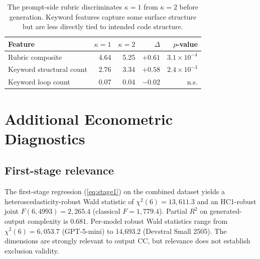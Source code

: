 \documentclass{article}
\begin{document}
\begin{table}[h]
\centering
\caption{The prompt-side rubric discriminates $\kappa=1$ from $\kappa=2$ before generation. Keyword features capture some surface structure but are less directly tied to intended code structure.}
\label{tab:low-end-separation}
\begin{tabular}{@{}lrrrr@{}}
\toprule
Feature & $\kappa=1$ & $\kappa=2$ & $\Delta$ & $p$-value \\
\midrule
Rubric composite                  & 4.64 & 5.25 & $+0.61$ & $3.1\times10^{-4}$ \\
Keyword structural count          & 2.76 & 3.34 & $+0.58$ & $2.4\times10^{-3}$ \\
Keyword loop count                & 0.07 & 0.04 & $-0.02$ & n.s. \\
\bottomrule
\end{tabular}
\end{table}

\section{Additional Econometric Diagnostics}
\label{app:econ-diagnostics}

\subsection{First-stage relevance}

The first-stage regression (\ref{eq:stage1}) on the combined dataset yields a heteroscedasticity-robust Wald statistic of $\chi^2(6)=13{,}611.3$ and an HC1-robust joint $F(6,4993)=2{,}265.4$ (classical $F=1{,}779.4$). Partial $R^2$ on generated-output complexity is $0.681$. Per-model robust Wald statistics range from $\chi^2(6)=6{,}053.7$ (GPT-5-mini) to 14{,}693.2 (Devstral Small 2505). The dimensions are strongly relevant to output CC, but relevance does not establish exclusion validity.
\end{document}
